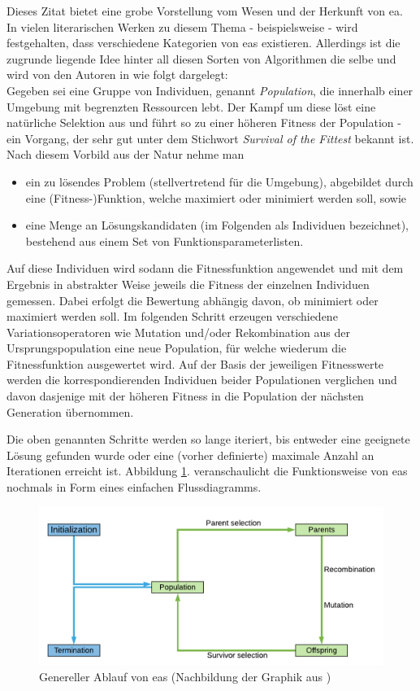 		Dieses Zitat bietet eine grobe Vorstellung vom Wesen und der Herkunft von \gls{ea}. In vielen literarischen Werken zu diesem Thema - beispielsweise \cite{ger-kla-kru-intro, eib-smi-ea} - wird festgehalten, dass verschiedene Kategorien von \gls{ea}s existieren. Allerdings ist die zugrunde liegende Idee hinter all diesen Sorten von Algorithmen die selbe und wird von den Autoren in \cite{eib-smi-ea} wie folgt dargelegt:\\
		Gegeben sei eine Gruppe von Individuen, genannt \textit{Population}, die innerhalb einer Umgebung mit begrenzten Ressourcen lebt. Der Kampf um diese löst eine natürliche Selektion aus und führt so zu einer höheren Fitness der Population - ein Vorgang, der sehr gut unter dem Stichwort \textit{Survival of the Fittest} bekannt ist. Nach diesem Vorbild aus der Natur nehme man
		\begin{itemize}
			\item ein zu lösendes Problem (stellvertretend für die Umgebung), abgebildet durch eine (Fitness-)Funktion, welche maximiert oder minimiert werden soll, sowie
			\item eine Menge an Lösungskandidaten (im Folgenden als Individuen bezeichnet), bestehend aus einem Set von Funktionsparameterlisten.
		\end{itemize}
		Auf diese Individuen wird sodann die Fitnessfunktion angewendet und mit dem Ergebnis in abstrakter Weise jeweils die Fitness der einzelnen Individuen gemessen. Dabei erfolgt die Bewertung abhängig davon, ob minimiert oder maximiert werden soll. Im folgenden Schritt erzeugen verschiedene Variationsoperatoren wie Mutation und/oder Rekombination aus der Ursprungspopulation eine neue Population, für welche wiederum die Fitnessfunktion ausgewertet wird. Auf der Basis der jeweiligen Fitnesswerte werden die korrespondierenden Individuen beider Populationen verglichen und davon dasjenige mit der höheren Fitness in die Population der nächsten Generation übernommen.
	
		Die oben genannten Schritte werden so lange iteriert, bis entweder eine geeignete Lösung gefunden wurde oder eine (vorher definierte) maximale Anzahl an Iterationen erreicht ist. Abbildung \ref{fig:ea-flowchart}. veranschaulicht die Funktionsweise von \gls{ea}s nochmals in Form eines einfachen Flussdiagramms.
	
		\begin{figure}[h]
			\centering
			\includegraphics[width=\linewidth]{ea_flowchart}
			\caption[Genereller Ablauf von \gls{ea}s]{Genereller Ablauf von \gls{ea}s (Nachbildung der Graphik aus \cite[Seite 27]{eib-smi-ea})}
			\label{fig:ea-flowchart}
		\end{figure}
	
